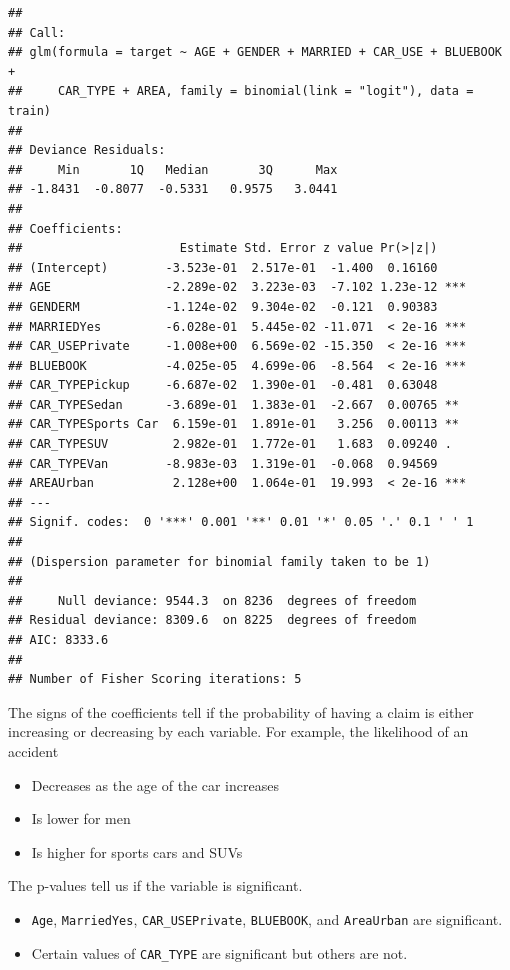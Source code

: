 \documentclass[openany]{book}
\providecommand{\tightlist}{%
  \setlength{\itemsep}{0pt}\setlength{\parskip}{0pt}}
\begin{document}
\begin{verbatim}
## 
## Call:
## glm(formula = target ~ AGE + GENDER + MARRIED + CAR_USE + BLUEBOOK + 
##     CAR_TYPE + AREA, family = binomial(link = "logit"), data = train)
## 
## Deviance Residuals: 
##     Min       1Q   Median       3Q      Max  
## -1.8431  -0.8077  -0.5331   0.9575   3.0441  
## 
## Coefficients:
##                      Estimate Std. Error z value Pr(>|z|)    
## (Intercept)        -3.523e-01  2.517e-01  -1.400  0.16160    
## AGE                -2.289e-02  3.223e-03  -7.102 1.23e-12 ***
## GENDERM            -1.124e-02  9.304e-02  -0.121  0.90383    
## MARRIEDYes         -6.028e-01  5.445e-02 -11.071  < 2e-16 ***
## CAR_USEPrivate     -1.008e+00  6.569e-02 -15.350  < 2e-16 ***
## BLUEBOOK           -4.025e-05  4.699e-06  -8.564  < 2e-16 ***
## CAR_TYPEPickup     -6.687e-02  1.390e-01  -0.481  0.63048    
## CAR_TYPESedan      -3.689e-01  1.383e-01  -2.667  0.00765 ** 
## CAR_TYPESports Car  6.159e-01  1.891e-01   3.256  0.00113 ** 
## CAR_TYPESUV         2.982e-01  1.772e-01   1.683  0.09240 .  
## CAR_TYPEVan        -8.983e-03  1.319e-01  -0.068  0.94569    
## AREAUrban           2.128e+00  1.064e-01  19.993  < 2e-16 ***
## ---
## Signif. codes:  0 '***' 0.001 '**' 0.01 '*' 0.05 '.' 0.1 ' ' 1
## 
## (Dispersion parameter for binomial family taken to be 1)
## 
##     Null deviance: 9544.3  on 8236  degrees of freedom
## Residual deviance: 8309.6  on 8225  degrees of freedom
## AIC: 8333.6
## 
## Number of Fisher Scoring iterations: 5
\end{verbatim}

The signs of the coefficients tell if the probability of having a claim is either increasing or decreasing by each variable. For example, the likelihood of an accident

\begin{itemize}
\tightlist
\item
  Decreases as the age of the car increases
\item
  Is lower for men
\item
  Is higher for sports cars and SUVs
\end{itemize}

The p-values tell us if the variable is significant.

\begin{itemize}
\tightlist
\item
  \texttt{Age}, \texttt{MarriedYes}, \texttt{CAR\_USEPrivate}, \texttt{BLUEBOOK}, and \texttt{AreaUrban} are significant.
\item
  Certain values of \texttt{CAR\_TYPE} are significant but others are not.
\end{itemize}
\end{document}
